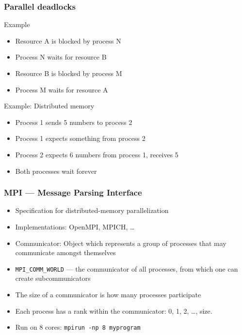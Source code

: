 \documentclass[usenames,dvipsnames,mathserif,compress]{beamer}
\begin{document}
\begin{frame}
  \frametitle{Parallel deadlocks}
  \begin{block}{Example}
  \begin{itemize}
  \item Resource A is blocked by process N
  \item Process N waits for resource B
  \item Resource B is blocked by process M
  \item Process M waits for resource A
  \end{itemize}
  \end{block}

  \begin{block}{Example: Distributed memory}
    \begin{itemize}
    \item Process 1 sends 5 numbers to process 2
    \item Process 1 expects something from process 2
    \item Process 2 expects 6 numbers from process 1, receives 5
    \item Both processes wait forever
    \end{itemize}
  \end{block}
\end{frame}

\begin{frame}[fragile]
  \frametitle{MPI --- Message Parsing Interface}
  \begin{itemize}
  \item Specification for distributed-memory parallelization
  \item Implementations: OpenMPI, MPICH, \ldots
  \item \alert{Communicator}: Object which represents a group of processes that may communicate amongst themselves
  \item \verb#MPI_COMM_WORLD# --- the communicator of all processes, from which one can create subcommunicators
  \item The \alert{size} of a communicator is how many processes participate
  \item Each process has a \alert{rank} within the communicator: 0, 1, 2, \ldots, size.
  \item Run on 8 cores: \texttt{mpirun -np 8 myprogram}
  \end{itemize}
\end{frame}
\end{document}
